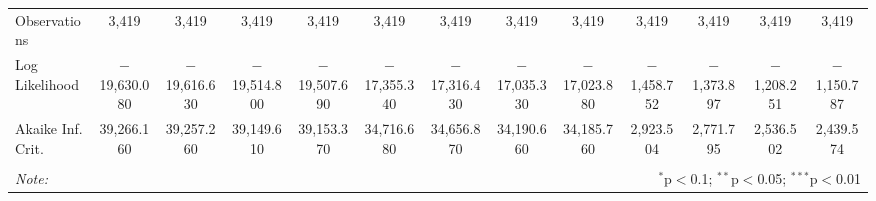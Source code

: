\begin{tabular}{@{\extracolsep{5pt}}lcccccccccccc}
Observations & 3,419 & 3,419 & 3,419 & 3,419 & 3,419 & 3,419 & 3,419 & 3,419 & 3,419 & 3,419 & 3,419 & 3,419 \\
Log Likelihood & $-$19,630.080 & $-$19,616.630 & $-$19,514.800 & $-$19,507.690 & $-$17,355.340 & $-$17,316.430 & $-$17,035.330 & $-$17,023.880 & $-$1,458.752 & $-$1,373.897 & $-$1,208.251 & $-$1,150.787 \\
Akaike Inf. Crit. & 39,266.160 & 39,257.260 & 39,149.610 & 39,153.370 & 34,716.680 & 34,656.870 & 34,190.660 & 34,185.760 & 2,923.504 & 2,771.795 & 2,536.502 & 2,439.574 \\
\hline
\hline \\[-1.8ex]
\textit{Note:}  & \multicolumn{12}{r}{$^{*}$p$<$0.1; $^{**}$p$<$0.05; $^{***}$p$<$0.01} \\
\end{tabular}
